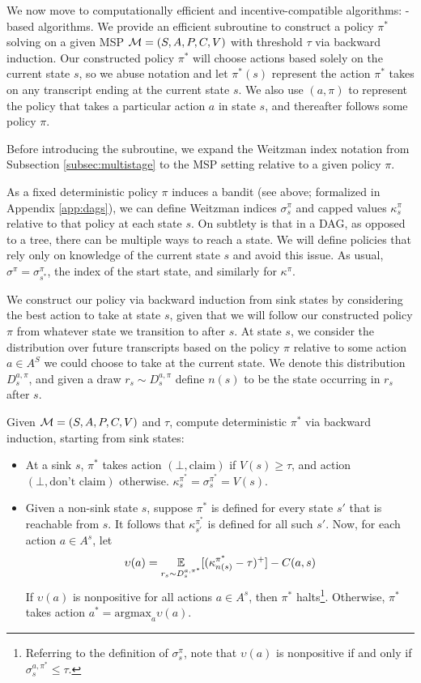 We now move to computationally efficient and incentive-compatible algorithms: \SAUP-based algorithms.
We provide an efficient subroutine to construct a policy $\pi^*$ solving \SAUP{} on a given MSP $\mathcal{M}=(S,A,P,C,V)$ with threshold $\tau$ via backward induction.
Our constructed policy $\pi^*$ will choose actions based solely on the current state $s$, so we abuse notation and let $\pi^*(s)$ represent the action $\pi^*$ takes on any transcript ending at the current state $s$.
We also use $(a,\pi)$ to represent the policy that takes a particular action $a$ in state $s$, and thereafter follows some policy $\pi$.


Before introducing the \MAXSAUP{} subroutine, we expand the Weitzman index notation from Subsection \ref{subsec:multistage} to the MSP setting relative to a given policy $\pi$.

As a fixed deterministic policy $\pi$ induces a bandit (see above; formalized in Appendix \ref{app:dags}), we can define Weitzman indices $\sigma_s^{\pi}$ and capped values $\kappa_s^{\pi}$ relative to that policy at each state $s$.
On subtlety is that in a DAG, as opposed to a tree, there can be multiple ways to reach a state.
We will define policies that rely only on knowledge of the current state $s$ and avoid this issue.
As usual, $\sigma^{\pi} = \sigma^{\pi}_{s^*}$, the index of the start state, and similarly for $\kappa^{\pi}$.

We construct our policy via backward induction from sink states by considering the best action to take at state $s$, given that we will follow our constructed policy $\pi$ from whatever state we transition to after $s$.
At state $s$, we consider the distribution over future transcripts based on the policy $\pi$ relative to some action $a\in A^S$ we could choose to take at the current state.
We denote this distribution $D_{s}^{a,\pi}$, and given a draw $r_s\sim D_{s}^{a,\pi}$ define $n(s)$ to be the state occurring in $r_s$ after $s$.

\begin{definition}
	Given $\mathcal{M}=(S,A,P,C,V)$ and $\tau$, compute deterministic $\pi^*$ via backward induction, starting from sink states:
	\begin{itemize}
		\item At a sink $s$, $\pi^*$ takes action $(\bot, \text{claim})$ if $V(s) \geq \tau$, and action $(\bot, \text{don't claim})$ otherwise.
		$\kappa_{s}^{\pi^*} = \sigma_s^{\pi^*} = V(s)$.
		\item Given a non-sink state $s$, suppose $\pi^*$ is defined for every state $s'$ that is reachable from $s$.
		It follows that $\kappa_{s'}^{\pi^*}$ is defined for all such $s'$.
		Now, for each action $a \in A^s$, let
		\[ \upsilon(a) = \operatorname*{\mathbb{E}}_{r_s \sim D_{s}^{a,\pi^*}}[(\kappa^{\pi^*}_{n(s)}-\tau)^+] - C(a,s)\]
		If $\upsilon(a)$ is nonpositive for all actions $a\in A^s$, then $\pi^*$ halts\footnote{Referring to the definition of $\sigma_s^{\pi}$,
			note that $\upsilon(a)$ is nonpositive if and only if $\sigma_s^{a,\pi^*} \leq \tau$.}. Otherwise, $\pi^*$ takes action $a^* = \text{argmax}_a \upsilon(a)$.
	\end{itemize}
\end{definition}

